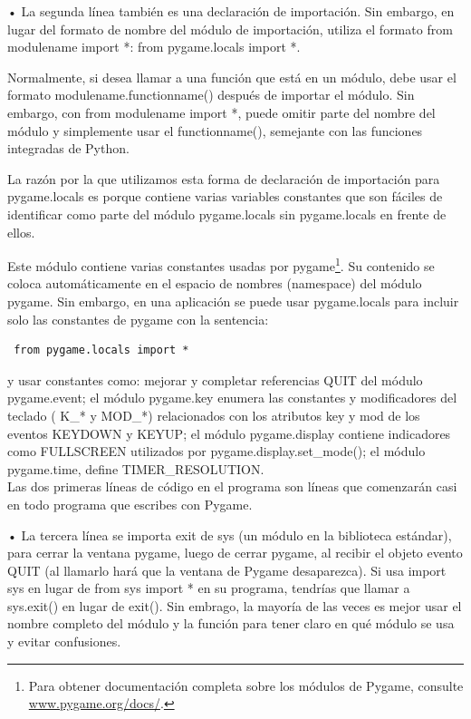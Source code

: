  • La segunda línea también es una declaración de importación. Sin embargo, en lugar del formato de nombre del módulo de importación,
utiliza el formato  {\ttfamily from modulename import *}:  {\ttfamily from pygame.locals import *}.

Normalmente, si desea llamar a una función que está en un módulo, debe usar el formato {\ttfamily modulename.functionname()}
después de importar el módulo.  Sin embargo, con {\ttfamily from modulename import *}, puede omitir  parte del nombre del módulo y simplemente usar el  {\ttfamily functionname()}, semejante con las funciones integradas de Python.

La razón por la que utilizamos esta forma de declaración de importación para {\ttfamily pygame.locals} es porque
contiene varias variables constantes que son fáciles de identificar como parte del módulo {\ttfamily pygame.locals} sin {\ttfamily pygame.locals} en frente de ellos.

Este módulo contiene varias constantes usadas por {\ttfamily pygame}{\footnote{Para obtener documentación completa sobre los módulos de Pygame, consulte \href{www.pygame.org/docs/}{\color{vino}www.pygame.org/docs/}.}}. Su contenido se coloca automáticamente en el espacio de nombres (namespace) del módulo {\ttfamily pygame}.  Sin embargo, en una aplicación se puede usar {\ttfamily pygame.locals} para  incluir solo las constantes de {\ttfamily pygame} con la sentencia:
\begin{lstlisting}
 from pygame.locals import *	
\end{lstlisting}
y usar constantes como: mejorar y completar referencias
{\ttfamily QUIT} del módulo  {\ttfamily pygame.event}; el módulo {\ttfamily pygame.key}  enumera las constantes y
 modificadores del teclado ( K\_* y MOD\_*) relacionados con los atributos {\ttfamily key} y {\ttfamily mod} de los
  eventos {\ttfamily KEYDOWN} y {\ttfamily KEYUP};  el módulo	 {\ttfamily pygame.display}  contiene indicadores como
   {\ttfamily FULLSCREEN} utilizados por {\ttfamily pygame.display.set\_mode()}; el módulo	{\ttfamily pygame.time}, 
 define {\ttfamily TIMER\_RESOLUTION}.\\





Las  dos primeras líneas de código en el programa  son líneas que comenzarán casi en todo programa que escribes con Pygame.

• La tercera línea se importa  {\ttfamily exit} de {\ttfamily sys} (un módulo en la biblioteca estándar),  para cerrar la ventana pygame, luego de cerrar  pygame, al recibir el objeto evento {\ttfamily QUIT} (al llamarlo hará que la ventana de Pygame desaparezca). Si usa {\ttfamily import sys} en lugar de  {\ttfamily from sys import *} en su programa, tendrías que llamar a {\ttfamily sys.exit()}   en lugar de {\ttfamily exit()}.  Sin embrago,  la mayoría de las veces es mejor usar el nombre completo del módulo y la función para tener claro en qué módulo se usa y evitar confusiones.

